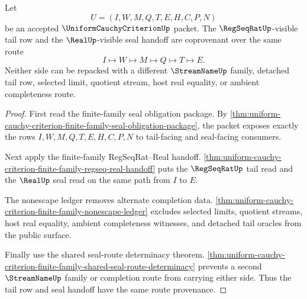 \begin{theorem}
\label{thm:uniform-cauchy-criterion-finite-family-real-seal-tail-coprovenance}
Let
$$
U=(I,W,M,Q,T,E,H,C,P,N)
$$
be an accepted $\UniformCauchyCriterionUp$ packet. The $\RegSeqRatUp$-visible
tail row and the $\RealUp$-visible seal handoff are coprovenant over the same
route
$$
I \longmapsto W \longmapsto M \longmapsto Q \longmapsto T \longmapsto E.
$$
Neither side can be repacked with a different $\StreamNameUp$ family,
detached tail row, selected limit, quotient stream, host real equality, or
ambient completeness route.
\end{theorem}
\begin{proof}
First read the finite-family seal obligation package. By
\autoref{thm:uniform-cauchy-criterion-finite-family-seal-obligation-package},
the packet exposes exactly the rows $I,W,M,Q,T,E,H,C,P,N$ to tail-facing and
seal-facing consumers.

Next apply the finite-family RegSeqRat--Real handoff.
\autoref{thm:uniform-cauchy-criterion-finite-family-regseq-real-handoff}
puts the $\RegSeqRatUp$ tail read and the $\RealUp$ seal read on the same path
from $I$ to $E$.

The nonescape ledger removes alternate completion data.
\autoref{thm:uniform-cauchy-criterion-finite-family-nonescape-ledger}
excludes selected limits, quotient streams, host real equality, ambient
completeness witnesses, and detached tail oracles from the public surface.

Finally use the shared seal-route determinacy theorem.
\autoref{thm:uniform-cauchy-criterion-finite-family-shared-seal-route-determinacy}
prevents a second $\StreamNameUp$ family or completion route from carrying
either side. Thus the tail row and seal handoff have the same route provenance.
\end{proof}

